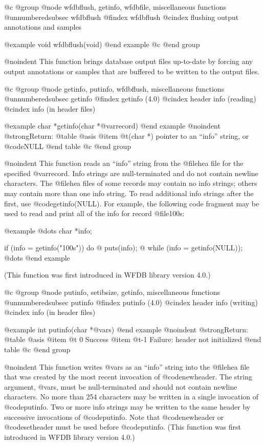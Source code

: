 {{{{{{{{{{@c @group
@node     wfdbflush, getinfo, wfdbfile, miscellaneous functions
@unnumberedsubsec wfdbflush
@findex wfdbflush
@cindex flushing output annotations and samples

@example
void wfdbflush(void)
@end example
@c @end group

@noindent
This function brings database output files up-to-date by forcing any
output annotations or samples that are buffered to be written to the
output files.

@c @group
@node     getinfo, putinfo, wfdbflush, miscellaneous functions
@unnumberedsubsec getinfo
@findex getinfo (4.0)
@cindex header info (reading) 
@cindex info (in header files)

@example
char *getinfo(char *@var{record})
@end example
@noindent
@strong{Return:}
@table @asis
@item @t{(char *)}
pointer to an ``info'' string, or @code{NULL}
@end table
@c @end group

@noindent
This function reads an ``info'' string from the @file{hea} file for
the specified @var{record}.  Info strings are null-terminated and do not
contain newline characters.  The @file{hea} files of some records may
contain no info strings;  others may contain more than one info string.
To read additional info strings after the first, use @code{getinfo(NULL)}.
For example, the following code fragment may be used to read and print
all of the info for record @file{100s}:

@example
@dots{}
char *info;

if (info = getinfo("100s"))
    do @{
        puts(info);
    @} while (info = getinfo(NULL));
@dots{}
@end example

(This function was first introduced in WFDB library version 4.0.)

@c @group
@node     putinfo, setibsize, getinfo, miscellaneous functions
@unnumberedsubsec putinfo
@findex putinfo (4.0)
@cindex header info (writing)
@cindex info (in header files)

@example
int putinfo(char *@var{s})
@end example
@noindent
@strong{Return:}
@table @asis
@item @t{ 0}
Success
@item @t{-1}
Failure: header not initialized
@end table
@c @end group

@noindent
This function writes @var{s} as an ``info'' string into the
@file{hea} file that was created by the most recent invocation of
@code{newheader}.  The string argument, @var{s}, must be null-terminated
and should not contain newline characters.  No more than 254 characters
may be written in a single invocation of @code{putinfo}.  Two or more
info strings may be written to the same header by successive
invocations of @code{putinfo}.  Note that @code{newheader} or
@code{setheader} must be used before @code{putinfo}.  (This function was
first introduced in WFDB library version 4.0.)

}}}}}}}}}}
